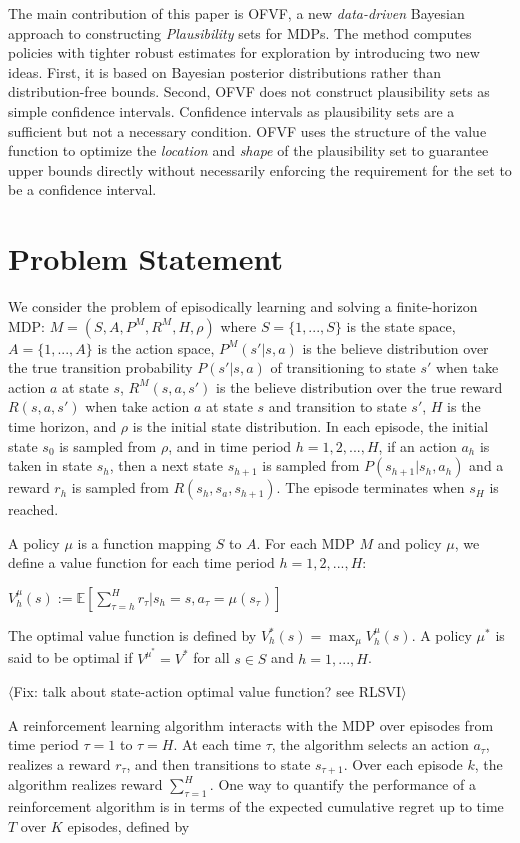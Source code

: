 \documentclass{article}
\newcommand{\fix}[1]{{$\langle${\color{red}\sc Fix: #1}$\rangle$}}
\theoremstyle{plain}
\theoremstyle{definition}
\begin{document}
The main contribution of this paper is OFVF, a new \emph{data-driven} Bayesian approach to constructing \emph{Plausibility} sets for MDPs. The method computes policies with tighter robust estimates for exploration by introducing two new ideas. First, it is based on Bayesian posterior distributions rather than distribution-free bounds. Second, OFVF does not construct plausibility sets as simple confidence intervals. Confidence intervals as plausibility sets are a sufficient but not a necessary condition. OFVF uses the structure of the value function to optimize the \emph{location} and \emph{shape} of the plausibility set to guarantee upper bounds directly without necessarily enforcing the requirement for the set to be a confidence interval.

\section{Problem Statement}

We consider the problem of episodically learning and solving a 
finite-horizon MDP: $M = (S, A, P^M, R^M, H, \rho)$ where $S =
\{1,...,S\}$ is the state space, $A = \{1,...,A\}$ is the action
space,  $P^M(s'|s,a)$ is the believe distribution over the true
transition probability $P(s'|s,a)$ of transitioning to state $s'$ when
take action $a$ at state $s$, $R^M(s,a,s')$ is the believe
distribution over the true reward $R(s,a,s')$ when take action $a$ at
state $s$ and transition to state $s'$, $H$ is the time horizon, and
$\rho$ is the initial state distribution. In each episode, the initial
state $s_0$ is sampled from $\rho$, and in time period
$h=1,2,...,H$, if an action $a_h$ is taken in state $s_h$, then a
next state $s_{h+1}$ is sampled from $P(s_{h+1}|s_h,a_h)$ and a reward
$r_h$ is sampled from $R(s_h,s_a,s_{h+1})$. The episode terminates
when $s_H$ is reached. 

A policy $\mu$ is a function mapping $S$ to $A$. For each MDP $M$ and
policy $\mu$, we define a value function for each time period
$h=1,2,...,H$:

$V_h^\mu(s):=\mathbb{E}[\sum_{\tau=h}^H
r_\tau|s_h=s,a_\tau=\mu(s_\tau)]$

The optimal value function is
defined by $V^*_h(s)=\max_\mu V_h^\mu(s)$. A policy $\mu^*$ is said to
be optimal if $V^{\mu^*}=V^*$ for all $s\in S$ and $h=1,...,H$.

\fix{talk about state-action optimal value function? see RLSVI}

A reinforcement learning algorithm interacts with the MDP over
episodes from time period $\tau=1$ to $\tau=H$. At each time $\tau$,
the algorithm selects an action $a_\tau$, realizes a reward $r_\tau$,
and then transitions to state $s_{\tau+1}$. Over each episode $k$, the
algorithm realizes reward $\sum_{\tau=1}^H$. One way to quantify the
performance of a reinforcement algorithm is in terms of the expected
cumulative regret up to time $T$ over $K$ episodes, defined by
\end{document}
